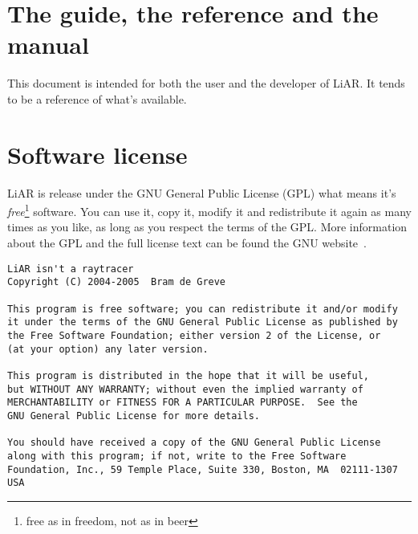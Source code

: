 \section{The guide, the reference and the manual}

This document is intended for both the user and the developer of LiAR.  It tends to be a reference of what's available.


\section{Software license}

LiAR is release under the GNU General Public License (GPL) what means it's \emph{free}\footnote{free as in freedom, not as in beer} software.  You can use it, copy it, modify it and redistribute it again as many times as you like, as long as you respect the terms of the GPL.  More information about the GPL and the full license text can be found the GNU website~\cite{GPL}.

\begin{footnotesize}
\begin{verbatim}
LiAR isn't a raytracer
Copyright (C) 2004-2005  Bram de Greve

This program is free software; you can redistribute it and/or modify
it under the terms of the GNU General Public License as published by
the Free Software Foundation; either version 2 of the License, or
(at your option) any later version.

This program is distributed in the hope that it will be useful,
but WITHOUT ANY WARRANTY; without even the implied warranty of
MERCHANTABILITY or FITNESS FOR A PARTICULAR PURPOSE.  See the
GNU General Public License for more details.

You should have received a copy of the GNU General Public License
along with this program; if not, write to the Free Software
Foundation, Inc., 59 Temple Place, Suite 330, Boston, MA  02111-1307  USA
\end{verbatim}
\end{footnotesize}